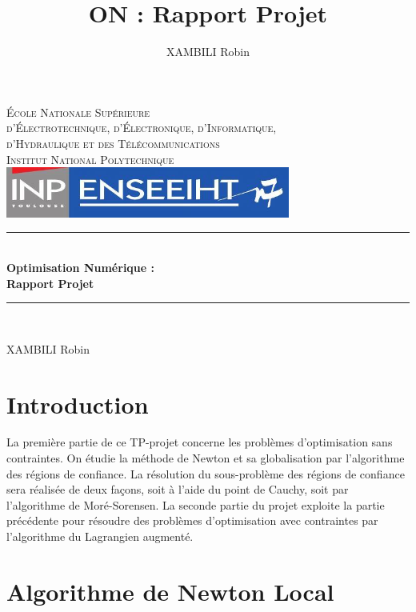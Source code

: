 \documentclass[a4paper,12pt]{article}
\title{ON : Rapport Projet}
\author{XAMBILI Robin}
\date{}
\theoremstyle{break}
\newcommand{\HRule}{\rule{\linewidth}{0.5mm}}
\begin{document}
\makeatletter
  \begin{titlepage}
  \centering
      {\large \textsc{École Nationale Supérieure \\ d'Électrotechnique, d'Électronique, d'Informatique, \\ d'Hydraulique et des Télécommunications}}\\ \vspace{0.50cm}
      \textsc{Institut National Polytechnique}\\
    \vspace{1cm}
      \includegraphics[width=0.7\textwidth]{img/n7.jpg}
  
    \vspace{3.5cm}
    \HRule \\[0.3cm]
    { \huge \bfseries Optimisation Numérique : \\ \vspace{3mm} Rapport Projet \\ 
    }
    \HRule \\[2cm]
    \vfill
    \vspace{2em}
             
    \large XAMBILI Robin
    \vfill
    \newpage
    \renewcommand{\contentsname}{SOMMAIRE}
    \tableofcontents
  \end{titlepage}


\section{Introduction}

La première partie de ce TP-projet concerne les problèmes d'optimisation sans contraintes. On étudie la méthode de Newton et sa globalisation par l'algorithme des régions de confiance. La résolution du sous-problème des régions de confiance sera réalisée de deux façons, soit à l'aide du point de Cauchy, soit par l'algorithme de Moré-Sorensen.
La seconde partie du projet exploite la partie précédente pour résoudre des problèmes d'optimisation avec contraintes par l'algorithme du Lagrangien augmenté.
\newpage
\section{Algorithme de Newton Local}
\end{document}

